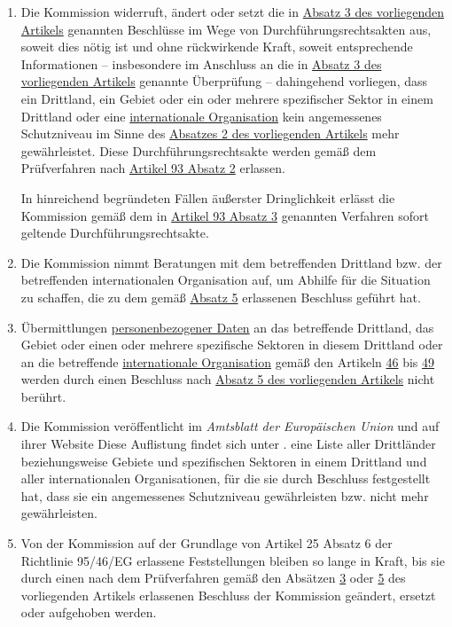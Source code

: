 \begin{enumerate}
  \item Die Kommission widerruft, ändert oder setzt die in \hyperref[itm:45-3]{Absatz 3 des vorliegenden Artikels}
   genannten Beschlüsse im Wege von Durchführungsrechtsakten aus, soweit dies nötig ist und ohne rückwirkende Kraft,
   soweit entsprechende Informationen -- insbesondere im Anschluss an die in \hyperref[itm:45-3]{Absatz 3 des
   vorliegenden Artikels} genannte Überprüfung -- dahingehend vorliegen, dass ein Drittland, ein Gebiet oder ein oder
   mehrere spezifischer Sektor in einem Drittland oder eine \hyperref[itm:04-26]{internationale Organisation} kein
   angemessenes Schutzniveau im Sinne des \hyperref[itm:45-2]{Absatzes 2 des vorliegenden Artikels} mehr gewährleistet.
   Diese Durchführungsrechtsakte werden gemäß dem Prüfverfahren nach \hyperref[itm:93-2]{Artikel 93 Absatz 2}
   erlassen. %
  \label{itm:45-5}

   In hinreichend begründeten Fällen äußerster Dringlichkeit erlässt die Kommission gemäß dem in \hyperref[itm:93-3]
   {Artikel 93 Absatz 3} genannten Verfahren sofort geltende Durchführungsrechtsakte.

  \item Die Kommission nimmt Beratungen mit dem betreffenden Drittland bzw. der betreffenden internationalen
   Organisation auf, um Abhilfe für die Situation zu schaffen, die zu dem gemäß \hyperref[itm:45-5]{Absatz 5}
   erlassenen Beschluss geführt hat.%
  \label{itm:45-6}

  \item Übermittlungen \hyperref[itm:04-1]{personenbezogener Daten} an das betreffende Drittland, das Gebiet oder einen
   oder mehrere spezifische Sektoren in diesem Drittland oder an die betreffende \hyperref[itm:04-26]
   {internationale Organisation} gemäß den Artikeln
   \hyperref[ch:46]{46} bis \hyperref[ch:49]{49} werden durch einen Beschluss nach \hyperref[itm:45-5]{Absatz 5 des
    vorliegenden Artikels} nicht berührt.%
  \label{itm:45-7}

  \item Die Kommission veröffentlicht im \emph{Amtsblatt der Europäischen Union} und auf ihrer Website\comment
   {Diese Auflistung findet sich unter \cite{adeq-list}.} eine Liste aller Drittländer beziehungsweise Gebiete und
   spezifischen Sektoren in einem Drittland und aller internationalen Organisationen, für die sie durch Beschluss
   festgestellt hat, dass sie ein angemessenes Schutzniveau gewährleisten bzw. nicht mehr gewährleisten. %
  \label{itm:45-8}

  \item Von der Kommission auf der Grundlage von Artikel 25 Absatz 6 der Richtlinie 95/46/EG erlassene Feststellungen
   bleiben so lange in Kraft, bis sie durch einen nach dem Prüfverfahren gemäß den Absätzen \hyperref[itm:45-3]
   {3} oder \hyperref[itm:45-5]{5} des vorliegenden Artikels erlassenen Beschluss der Kommission geändert, ersetzt oder
   aufgehoben werden.%
  \label{itm:45-9}

\end{enumerate}

